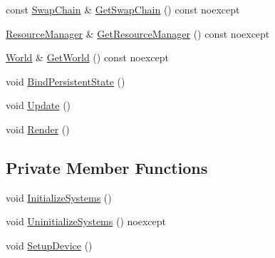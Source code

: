 \begin{DoxyCompactItemize}
\item 
const \hyperlink{classmage_1_1rendering_1_1_swap_chain}{Swap\+Chain} \& \hyperlink{classmage_1_1rendering_1_1_manager_1_1_impl_a7595cf95fc4af88ae359d77fce0681b3}{Get\+Swap\+Chain} () const noexcept
\item 
\hyperlink{classmage_1_1rendering_1_1_resource_manager}{Resource\+Manager} \& \hyperlink{classmage_1_1rendering_1_1_manager_1_1_impl_a604da1cb1bf3eb9783320ee1366c43a4}{Get\+Resource\+Manager} () const noexcept
\item 
\hyperlink{classmage_1_1rendering_1_1_world}{World} \& \hyperlink{classmage_1_1rendering_1_1_manager_1_1_impl_a01dbb540b262170ae3518c9a72945046}{Get\+World} () const noexcept
\item 
void \hyperlink{classmage_1_1rendering_1_1_manager_1_1_impl_a0ffe370f901194395d73f641f72313d6}{Bind\+Persistent\+State} ()
\item 
void \hyperlink{classmage_1_1rendering_1_1_manager_1_1_impl_a8fd123eb4cc188a207ca0bb9824c3f59}{Update} ()
\item 
void \hyperlink{classmage_1_1rendering_1_1_manager_1_1_impl_ac07444036f9accadde15f82f19d6c6ad}{Render} ()
\end{DoxyCompactItemize}
\subsection*{Private Member Functions}
\begin{DoxyCompactItemize}
\item 
void \hyperlink{classmage_1_1rendering_1_1_manager_1_1_impl_abb9706b54c07c3493ef906667051c336}{Initialize\+Systems} ()
\item 
void \hyperlink{classmage_1_1rendering_1_1_manager_1_1_impl_a0e2979e4330a5148da2fa6cabd19078f}{Uninitialize\+Systems} () noexcept
\item 
void \hyperlink{classmage_1_1rendering_1_1_manager_1_1_impl_ab5685e722d3d8afa96f30955c2d7c8a6}{Setup\+Device} ()
\end{DoxyCompactItemize}
